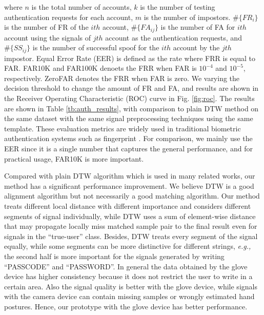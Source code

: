 \documentclass[conference]{IEEEtran}
\begin{document}
\noindent where $n$ is the total number of accounts, $k$ is the number of testing authentication requests for each account, $m$ is the number of impostors. $\#\{FR_i\}$ is the number of FR of the $ith$ account, $\#\{FA_{ij}\}$ is the number of FA for $ith$ account using the signals of $jth$ account as the authentication requests, and $\#\{SS_{ij}\}$ is the number of successful spoof for the $ith$ account by the $jth$ impostor. Equal Error Rate (EER) is defined as the rate where FRR is equal to FAR. FAR10K and FAR100K denoets the FRR when FAR is $10^{-4}$ and $10^{-5}$, respectively. ZeroFAR denotes the FRR when FAR is zero. We varying the decision threshold to change the amount of FR and FA, and results are shown in the Receiver Operating Characteristic (ROC) curve in Fig. \ref{fig:roc}. The results are shown in Table \ref{tb:auth_results}, with comparison to plain DTW method on the same dataset with the same signal preprocessing techniques using the same template. These evaluation metrics are widely used in traditional biometric authentication systems such as fingerprint \cite{Fingerprint}. For comparison, we mainly use the EER since it is a single number that captures the general performance, and for practical usage, FAR10K is more important.


Compared with plain DTW algorithm which is used in many related works, our method has a significant performance improvement. We believe DTW is a good alignment algorithm but not necessarily a good matching algorithm. Our method treats different local distance with different importance and considers different segments of signal individually, while DTW uses a sum of element-wise distance that may propagate locally miss matched sample pair to the final result even for signals in the ``true-user'' class. Besides, DTW treats every segment of the signal equally, while some segments can be more distinctive for different strings, \textit{e.g.,} the second half is more important for the signals generated by writing ``PASSCODE'' and ``PASSWORD''. In general the data obtained by the glove device has higher consistency because it does not restrict the user to write in a certain area. Also the signal quality is better with the glove device, while signals with the camera device can contain missing samples or wrongly estimated hand postures. Hence, our prototype with the glove device has better performance.
\end{document}
